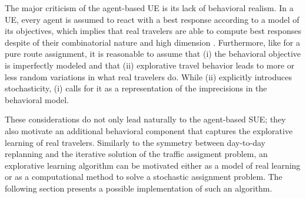 The major criticism of the agent-based UE is its lack of behavioral realism.
In a UE, every agent is assumed to react with a best response 
according to a model of its objectives, which implies 
that real travelers are able to compute best responses
despite of their combinatorial nature and high dimension
\citep{bowman-1998}.
Furthermore, like for a pure route assignment, it
is reasonable to assume that (i) the behavioral objective is
imperfectly modeled and that (ii) explorative travel behavior leads
to more or less random variations in what real travelers do.
While (ii) explicitly introduces stochasticity, (i) calls for it as a
representation of the imprecisions in the behavioral model.

These considerations do not only lead naturally to the agent-based SUE;
they also motivate an additional behavioral component that captures
the explorative learning of real travelers. Similarly to the symmetry
between day-to-day replanning and the iterative solution of the traffic assigment
problem, an explorative learning algorithm can be motivated either as
a model of real learning or as a computational method to solve a stochastic
assignment problem. The following section presents a possible implementation
of such an algorithm. 



